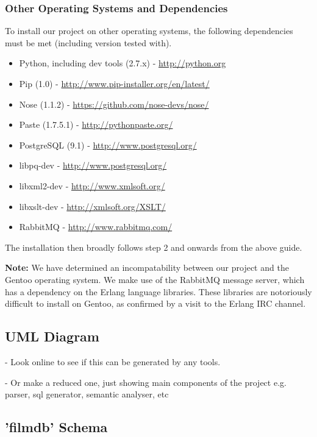 \documentclass[a4paper, 11pt]{article}
\begin{document}
  \subsubsection{Other Operating Systems and Dependencies}

  To install our project on other operating systems, the following dependencies
  must be met (including version tested with).

  \begin{itemize}
    \item Python, including dev tools (2.7.x) - \url{http://python.org}
    \item Pip (1.0) - \url{http://www.pip-installer.org/en/latest/}
    \item Nose (1.1.2) - \url{https://github.com/nose-devs/nose/}
    \item Paste (1.7.5.1) - \url{http://pythonpaste.org/}
    \item PostgreSQL (9.1) - \url{http://www.postgresql.org/}
    \item libpq-dev - \url{http://www.postgresql.org/}
    \item libxml2-dev - \url{http://www.xmlsoft.org/}
    \item libxslt-dev - \url{http://xmlsoft.org/XSLT/}
    \item RabbitMQ - \url{http://www.rabbitmq.com/}
  \end{itemize}

  The installation then broadly follows step 2 and onwards from the above
  guide.

  \textbf{Note:} We have determined an incompatability between our project and
  the Gentoo operating system. We make use of the RabbitMQ message server,
  which has a dependency on the Erlang language libraries. These libraries
  are notoriously difficult to install on Gentoo, as confirmed by a visit to
  the Erlang IRC channel.

  \subsection{UML Diagram}

  - Look online to see if this can be generated by any tools.

  - Or make a reduced one, just showing main components of the project e.g.
  parser, sql generator, semantic analyser, etc

  \subsection{'filmdb' Schema}
\end{document}
